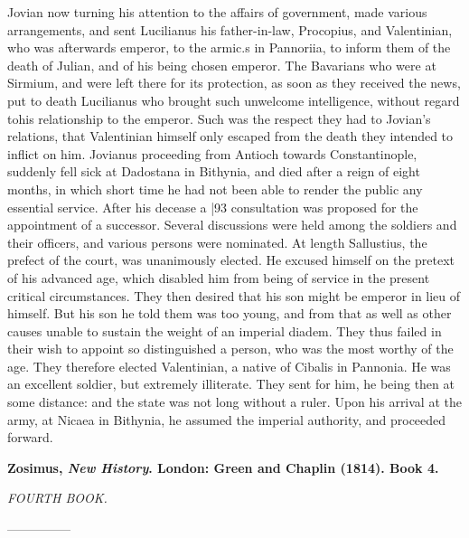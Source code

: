 Jovian now turning his attention to the affairs of government, made various arrangements, and sent Lucilianus his father-in-law, Procopius, and Valentinian, who was afterwards emperor, to the armic.s in Pannoriia, to inform them of the death of Julian, and of his being chosen emperor. The Bavarians who were at Sirmium, and were left there for its protection, as soon as they received the news, put to death Lucilianus who brought such unwelcome intelligence, without regard to\emph{}his relationship to the emperor. Such was the respect they had to Jovian's relations, that Valentinian himself only escaped from the death they intended to inflict on him. Jovianus proceeding from Antioch towards Constantinople,
suddenly fell sick at Dadostana in Bithynia, and died after a reign of eight months, in which short time he had not been able to render the public any essential service. After his decease a
|93 consultation was proposed for the appointment of a successor. Several discussions were held among the soldiers and their officers, and various persons were nominated. At length Sallustius, the prefect of the court, was unanimously elected. He excused himself on the pretext of his advanced age, which disabled him from being of service in the present critical circumstances. They then desired that his son might be emperor in lieu of himself. But his son he told them was too young, and from that as well as other causes unable to sustain the weight of an imperial diadem. They thus failed in their wish to appoint so distinguished a person, who was the most worthy of the age. They therefore elected Valentinian, a native of Cibalis in Pannonia. He was an excellent soldier, but extremely illiterate. They sent for him, he being then at some distance: and the state was not long without a ruler. Upon his arrival at the army, at Nicaea in Bithynia, he assumed the imperial authority, and proceeded forward.


\textbf{Zosimus, \emph{New History}. London: Green and Chaplin
(1814). Book 4.}

\emph{FOURTH BOOK.}

---------------

